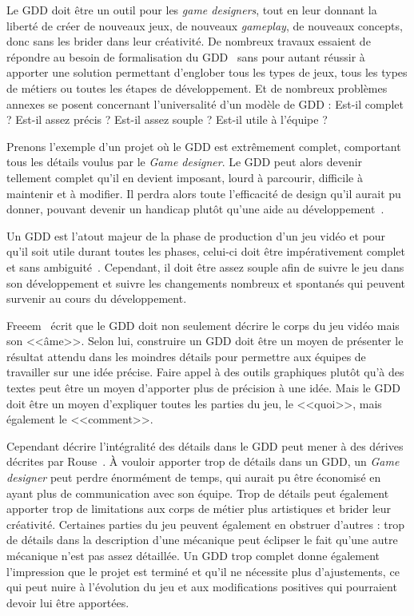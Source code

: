 
Le GDD doit \^etre un outil pour les \emph{game designers}, tout en leur donnant la liberté de créer de nouveaux jeux, de nouveaux \emph{gameplay}, de nouveaux concepts, donc sans les brider dans leur cr\'eativit\'e.
De nombreux travaux essaient de répondre au besoin de formalisation du GDD~\cite{GDD_software,multiview,GDD_GDProject,gama_greateGDD} sans pour autant réussir à apporter une solution permettant d'englober tous les types de jeux, tous les types de métiers ou toutes les étapes de développement.
Et de nombreux problèmes annexes se posent concernant l'universalité d'un modèle de GDD : Est-il complet ? Est-il assez précis ? Est-il assez souple ? Est-il utile à l'équipe ? 

Prenons l'exemple d'un projet où le GDD est extrêmement complet, comportant tous les détails voulus par le \emph{Game designer}.
Le GDD peut alors devenir tellement complet qu'il en devient imposant, lourd à parcourir, difficile à maintenir et à modifier.
Il perdra alors toute l'efficacité de design qu'il aurait pu donner, pouvant devenir un handicap plutôt qu'une aide au développement~\cite{onepage_librande}.

Un GDD est l'atout majeur de la phase de production d'un jeu vidéo et pour qu'il soit utile durant toutes les phases, celui-ci doit être impérativement complet et sans ambiguité~\cite{GD_Guidelines}.
Cependant, il doit être assez souple afin de suivre le jeu dans son développement et suivre les changements nombreux et spontan\'es qui peuvent survenir au cours du développement.

Freeem~\cite{gama_greateGDD} écrit que le GDD doit non seulement décrire le corps du jeu vidéo mais son <<âme>>.
Selon lui, construire un GDD doit être un moyen de présenter le résultat attendu dans les moindres détails pour permettre aux équipes de travailler sur une idée précise.
Faire appel à des outils graphiques plutôt qu'à des textes peut être un moyen d'apporter plus de précision à une idée.
Mais le GDD doit être un moyen d'expliquer toutes les parties du jeu, le <<quoi>>, mais également le <<comment>>.

Cependant décrire l'intégralité des détails dans le GDD peut mener à des dérives décrites par Rouse~\cite{GD_theory_rouse}.
À vouloir apporter trop de détails dans un GDD, un \emph{Game designer} peut perdre énormément de temps, qui aurait pu être économisé en ayant plus de communication avec son équipe.
Trop de détails peut également apporter trop de limitations aux corps de métier plus artistiques et brider leur créativité.
Certaines parties du jeu peuvent également en obstruer d'autres : trop de détails dans la description d'une mécanique peut éclipser le fait qu'une autre mécanique n'est pas assez détaillée.
Un GDD trop complet donne également l'impression que le projet est terminé et qu'il ne nécessite plus d'ajustements, ce qui peut nuire à l'évolution du jeu et aux modifications positives qui pourraient devoir lui être apport\'ees.


